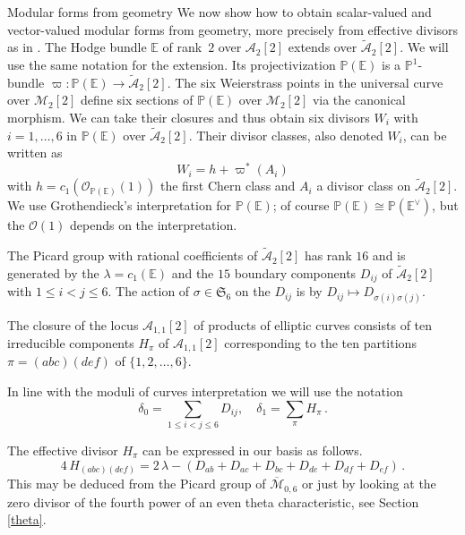 \documentclass[12pt]{amsart}
\numberwithin{equation}{section}
\newcommand{\EE}{\mathbb E}
\newcommand{\PP}{\mathbb P}
\def\leq{\leqslant}
\numberwithin{equation}{section}
\theoremstyle{definition}
\theoremstyle{remark}
\begin{document}
\begin{section}{Modular forms from geometry}
We now show how to obtain scalar-valued and vector-valued modular forms 
from geometry, more precisely from effective divisors as in \cite{vdG-K}.
The Hodge bundle ${\EE}$ of rank~$2$ over $\mathcal{A}_2[2]$ extends over $\tilde{\mathcal{A}}_2[2]$. 
We will use the same notation for the extension. Its projectivization ${\PP}({\EE})$ is a ${\PP}^1$-bundle
$\varpi: {\PP}({\EE})\to \tilde{\mathcal{A}}_2[2]$.
The six Weierstrass points in the universal curve over $\mathcal{M}_2[2]$ define six sections of
${\PP}({\EE})$ over $\mathcal{M}_2[2]$ via the canonical morphism. We can take their closures and thus obtain six divisors $W_i$
with $i=1,\ldots,6$ in ${\PP}({\EE})$ over $\tilde{\mathcal{A}}_2[2]$. 
Their divisor classes, also denoted $W_i$, can be written as
$$
W_i= h+\varpi^*(A_i)
$$
with $h=c_1(\mathcal{O}_{{\PP}({\EE})}(1))$ the first Chern class and $A_i$ a divisor class on $\tilde{\mathcal{A}}_2[2]$.
We use Grothendieck's interpretation for ${\PP}({\EE})$; of course ${\PP}({\EE})\cong {\PP}({\EE}^{\vee})$, but the $\mathcal{O}(1)$
depends on the interpretation.

The Picard group with rational coefficients of  $\tilde{\mathcal{A}}_2[2]$ has rank $16$ and is generated by the
$\lambda=c_1({\EE})$ and the $15$ boundary components $D_{ij}$ of $\tilde{\mathcal{A}}_2[2]$ with $1\leq i < j \leq 6$.
The action of $\sigma \in \mathfrak{S}_6$ on the $D_{ij}$ is by $D_{ij} \mapsto D_{\sigma(i) \sigma(j)}$.

The closure of the locus $\mathcal{A}_{1,1}[2]$ of products of elliptic curves consists 
of ten irreducible components $H_{\pi}$ of $\mathcal{A}_{1,1}[2]$ corresponding to the ten partitions $\pi=(abc)(def)$ of 
$\{1,2,\ldots,6\}$.

In line with the moduli of curves interpretation we will use the notation
$$
\delta_0=\sum_{1 \leq i < j \leq 6} D_{ij}, \quad \delta_1=\sum_{\pi} H_{\pi} \, .
$$

The effective divisor $H_{\pi}$ can be expressed in our basis as follows.
\begin{equation} \label{tenrelations}
4\, H_{(abc)(def)}= 2\, \lambda - \left( D_{ab}+D_{ac}+D_{bc}+D_{de}+D_{df}+D_{ef} \right) \, . 
\end{equation}
This may be deduced from the Picard group of $\overline{\mathcal{M}}_{0,6}$ or just by looking
at the zero divisor of the fourth power of an even theta characteristic, see Section \ref{theta}.


\end{section}
\end{document}
